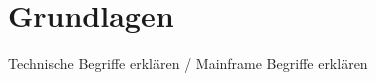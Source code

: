 \chapter{Grundlagen}\label{ch:grundlagen}

Technische Begriffe erklären / Mainframe Begriffe erklären

